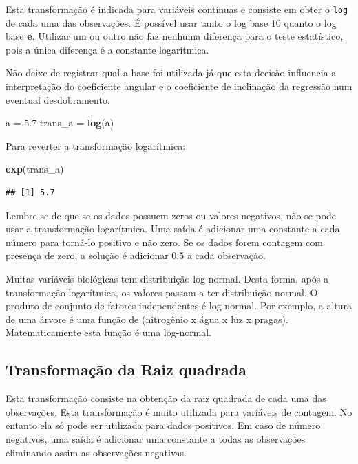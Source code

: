 \documentclass[
]{article}
\newenvironment{Shaded}{\begin{snugshade}}{\end{snugshade}}
\newcommand{\FloatTok}[1]{\textcolor[rgb]{0.00,0.00,0.81}{#1}}
\newcommand{\KeywordTok}[1]{\textcolor[rgb]{0.13,0.29,0.53}{\textbf{#1}}}
\newcommand{\NormalTok}[1]{#1}
\newcommand{\StringTok}[1]{\textcolor[rgb]{0.31,0.60,0.02}{#1}}
\begin{document}
Esta transformação é indicada para variáveis contínuas e consiste em obter o \texttt{log} de cada uma das observações. É possível usar tanto o log base 10 quanto o log base \textbf{e}. Utilizar um ou outro não faz nenhuma diferença para o teste estatístico, pois a única diferença é a constante logarítmica.

Não deixe de registrar qual a base foi utilizada já que esta decisão influencia a interpretação do coeficiente angular e o coeficiente de inclinação da regressão num eventual desdobramento.

\begin{Shaded}
\begin{Highlighting}[]
\NormalTok{a =}\StringTok{ }\FloatTok{5.7}
\NormalTok{trans_a =}\StringTok{ }\KeywordTok{log}\NormalTok{(a)}
\end{Highlighting}
\end{Shaded}

Para reverter a transformação logarítmica:

\begin{Shaded}
\begin{Highlighting}[]
\KeywordTok{exp}\NormalTok{(trans_a)}
\end{Highlighting}
\end{Shaded}

\begin{verbatim}
## [1] 5.7
\end{verbatim}

Lembre-se de que se os dados possuem zeros ou valores negativos, não se pode usar a transformação logarítmica. Uma saída é adicionar uma constante a cada número para torná-lo positivo e não zero. Se os dados forem contagem com presença de zero, a solução é adicionar 0,5 a cada observação.

Muitas variáveis biológicas tem distribuição log-normal. Desta forma, após a transformação logarítmica, os valores passam a ter distribuição normal. O produto de conjunto de fatores independentes é log-normal. Por exemplo, a altura de uma árvore é uma função de (nitrogênio x água x luz x pragas). Matematicamente esta função é uma log-normal.

\hypertarget{transformauxe7uxe3o-da-raiz-quadrada}{%
\subsection{Transformação da Raiz quadrada}\label{transformauxe7uxe3o-da-raiz-quadrada}}

Esta transformação consiste na obtenção da raiz quadrada de cada uma das observações. Esta transformação é muito utilizada para variáveis de contagem. No entanto ela só pode ser utilizada para dados positivos. Em caso de número negativos, uma saída é adicionar uma constante a todas as observações eliminando assim as observações negativas.
\end{document}

